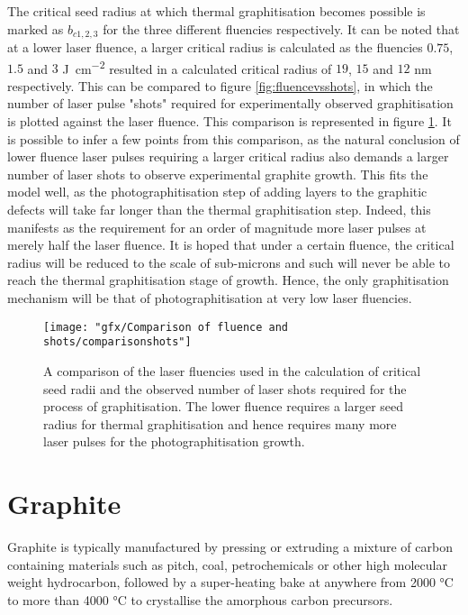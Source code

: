 The critical seed radius at which thermal graphitisation becomes possible is marked as $b_{c1,2,3}$ for the three different fluencies respectively. It can be noted that at a lower laser fluence, a larger critical radius is calculated as the fluencies $0.75$, $1.5$ and $3$ \si{\joule\per\centi\metre\squared} resulted in a calculated critical radius of $19$, $15$ and $12$ \si{\nano\metre} respectively. This can be compared to figure \ref*{fig:fluencevsshots}, in which the number of laser pulse "shots" required for experimentally observed graphitisation is plotted against the laser fluence. This comparison is represented in figure \ref{fig:comparisonshots}. It is possible to infer a few points from this comparison, as the natural conclusion of lower fluence laser pulses requiring a larger critical radius also demands a larger number of laser shots to observe experimental graphite growth. This fits the model well, as the photographitisation step of adding layers to the graphitic defects will take far longer than the thermal graphitisation step. Indeed, this manifests as the requirement for an order of magnitude more laser pulses at merely half the laser fluence. It is hoped that under a certain fluence, the critical radius will be reduced to the scale of sub-microns and such will never be able to reach the thermal graphitisation stage of growth. Hence, the only graphitisation mechanism will be that of photographitisation at very low laser fluencies.

\begin{figure}
	\centering
	\texttt{[image: "gfx/Comparison of fluence and shots/comparisonshots"]}
	\caption{A comparison of the laser fluencies used in the calculation of critical seed radii and the observed number of laser shots required for the process of graphitisation. The lower fluence requires a larger seed radius for thermal graphitisation and hence requires many more laser pulses for the photographitisation growth.}
	\label{fig:comparisonshots}
\end{figure}

\section{Graphite}
Graphite is typically manufactured by pressing or extruding a mixture of carbon containing materials such as pitch, coal, petrochemicals or other high molecular weight hydrocarbon, followed by a super-heating bake at anywhere from 2000 \si{\degreeCelsius} to more than 4000 \si{\degreeCelsius} to crystallise the amorphous carbon precursors. 

